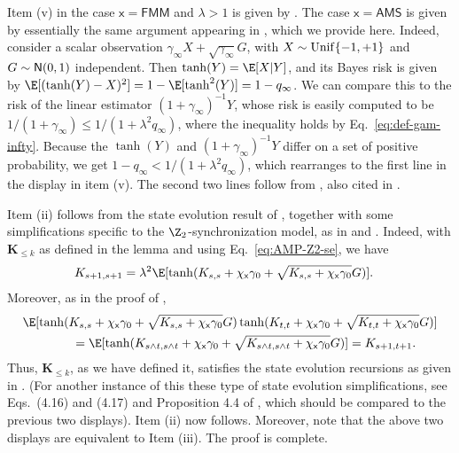 \documentclass[]{article}
\def\sx{{\mathsf x}}
\def\Unif{{\sf Unif}}
\def\normal{{\sf N}}
\def\Unif{{\rm Unif}}
\def\normal{{\sf N}}
\def\bK{\boldsymbol{K}}
\def\FMM{\mathsf{FMM}}
\def\AMS{\mathsf{AMS}}
\begin{document}
Item (v) in the case $\sx = \FMM$ and $\lambda > 1$ is given by \cite[Proposition A.2]{celentanoFanMei2021}.
The case $\sx = \AMS$ is given by essentially the same argument appearing in \cite{celentanoFanMei2021},
which we provide here.
Indeed, consider a scalar observation $\gamma_\infty X + \sqrt{\gamma_\infty} G$, with $X \sim \Unif\{-1,+1\}$ and $G \sim \normal(0,1)$ independent. 
Then $\tanh(Y) = \E[X|Y]$, 
and its Bayes risk is given by $\E[(\tanh(Y) - X)^2] = 1 - \E[\tanh^2(Y)] = 1 - q_\infty$.
We can compare this to the risk of the linear estimator $(1 + \gamma_\infty)^{-1} Y$,
whose risk is easily computed to be $1/ (1+\gamma_\infty) \leq 1 / (1 + \lambda^2 q_\infty)$,
where the inequality holds by Eq.~\eqref{eq:def-gam-infty}.
Because the $\tanh(Y)$ and $(1 + \gamma_\infty)^{-1}Y$ differ on a set of positive probability,
we get $1 - q_\infty < 1 / (1 + \lambda^2q_\infty)$,
which rearranges to the first line in the display in item (v).
The second two lines follow from \cite[Appendix B.2]{deshpande2016},
also cited in \cite[Proposition A.2]{celentanoFanMei2021}.

Item (ii) follows from the state evolution result of \cite{bayatiMontanari2010},
together with some simplifications specific to the $\Z_2$-synchronization model,
as in \cite[Eqs. (69),(70)]{deshpande2016} and \cite[Proposition 4.4]{AlaouiMontanariSelke2022}.
Indeed, with $\bK_{\leq k}$ as defined in the lemma and using Eq.~\eqref{eq:AMP-Z2-se},
we have
\begin{equation}
\begin{aligned}
    K_{s+1,s+1}
        &= 
        \lambda^2 \E[\tanh(K_{s,s} + \chi_{\sx}\gamma_0 + \sqrt{K_{s,s} + \chi_{\sx}\gamma_0} G )].
\end{aligned}
\end{equation}
Moreover, as in the proof of \cite[Proposition 4.4]{AlaouiMontanariSelke2022},
\begin{equation}
\begin{aligned}
    &\E[\tanh(K_{s,s} + \chi_{\sx}\gamma_0 + \sqrt{K_{s,s} + \chi_{\sx}\gamma_0} G )\tanh(K_{t,t} + \chi_{\sx}\gamma_0 + \sqrt{K_{t,t} + \chi_{\sx}\gamma_0} G )]
    \\
    &\qquad\qquad =
    \E[\tanh(K_{s\wedge t,s\wedge t} + \chi_{\sx}\gamma_0 + \sqrt{K_{s\wedge t,s\wedge t} + \chi_{\sx}\gamma_0} G )] = K_{s+1,t+1}.
\end{aligned}
\end{equation}
Thus, $\bK_{\leq k}$,
as we have defined it,
satisfies the state evolution recursions as given in \cite{bayatiMontanari2010}.
(For another instance of this these type of state evolution simplifications, 
see Eqs.~(4.16) and (4.17) and Proposition 4.4 of \cite{AlaouiMontanariSelke2022}, which should be compared to the previous two displays).
Item (ii) now follows.
Moreover, note that the above two displays are equivalent to Item (iii).
The proof is complete.
\end{document}
